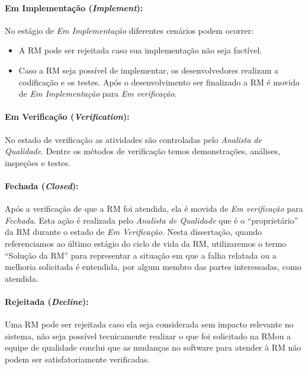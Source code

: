 \paragraph{Em Implementação (\textit{Implement}):}\label{par:em_implementacao}

No estágio de \textit{Em Implementação} diferentes cenários podem ocorrer:

\begin{itemize}
	\item A RM pode ser rejeitada caso sua implementação não seja factível.
    \item Caso a RM seja possível de implementar, os desenvolvedores realizam a
        codificação e os testes. Após o desenvolvimento ser finalizado a RM é
        movida de \textit{Em Implementação} para \textit{Em verificação}.
\end{itemize}

\paragraph{Em Verificação (\textit{Verification}):}\label{par:em_verificacao}

No estado de verificação as atividades são controladas pelo \textit{Analista de
Qualidade}. Dentre os métodos de verificação temos demonstrações, análises,
inspeções e testes.

\paragraph{Fechada (\textit{Closed}):}\label{par:fechada}

Após a verificação de que a RM foi atendida, ela é movida de \textit{Em
    verificação} para \textit{Fechada}. Esta ação é realizada pelo
\textit{Analista de Qualidade} que é o ``proprietário'' da RM durante o estado
de \textit{Em Verificação}. Nesta dissertação, quando referenciamos ao último
estágio do ciclo de vida da RM, utilizaremos o termo ``Solução da RM'' para
representar a situação em que a falha relatada ou a melhoria solicitada é
entendida, por algum membro das partes interessadas, como atendida.

\paragraph{Rejeitada (\textit{Decline}):}\label{par:rejeitada}

Uma RM pode ser rejeitada caso ela seja considerada sem impacto relevante no
sistema, não seja possível tecnicamente realizar o que foi solicitado na RM\@ ou
a equipe de qualidade conclui que as mudanças no software para atender à RM não
podem ser satisfatoriamente verificadas.

